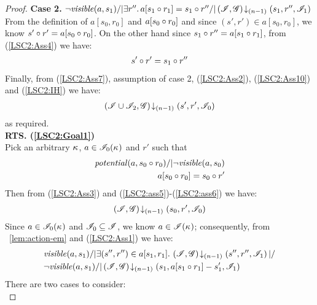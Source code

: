 \begin{lemma}
\begin{proof}
\noindent\textbf{Case 2. }
$\neg\mathit{visible}(a, s_1) /| \exists r''.\, a[s_1 \circ r_1] = s_1 \circ r'' /| \left(\mathscr{I}, \mathscr{G}\right) \!\downarrow_{(n-1)} \left(s_1, r'', \mathscr{I}_1\right)$\\
From the definition of $a[s_0, r_0]$ and $a[s_0 \circ r_0]$ and since $(s', r') \in a[s_0, r_0]$, we know $s' \circ r' = a[s_0 \circ r_0]$. On the other hand since $s_1 \circ r'' = a[s_1 \circ r_1]$, from (\ref{LSC2:Ass4}) we have:
%
\begin{align}
	s' \circ r' = s_1 \circ r'' \label{LSC2:Ass10}
\end{align}
%
Finally, from (\ref{LSC2:Ass7}), assumption of case 2, (\ref{LSC2:Ass2}), (\ref{LSC2:Ass10}) and (\ref{LSC2:IH}) we have: 
%
\begin{align*}
	\left(\mathscr{I} \cup \mathscr{I}_2, \mathscr{G}\right) \!\downarrow_{(n-1)} \left(s', r', \mathscr{I}_0\right)
\end{align*}
%
as required.\\
%
%
%
%

%
\noindent\textbf{RTS. (\ref{LSC2:Goal1})} \\
Pick an arbitrary $\kappa_{}$, $a \in \mathscr{I}_0(\kappa_{})$ and $r'$ such that
%
\begin{align}
	\mathit{potential}(a, s_0 \circ r_0) /| \neg\mathit{visible}(a, s_0) \label{LSC2:ass5}\\
	a[s_0 \circ r_0] = s_0 \circ r' \label{LSC2:ass6}
\end{align}
Then from (\ref{LSC2:Ass3}) and (\ref{LSC2:ass5})-(\ref{LSC2:ass6}) we have:
%
\begin{align}
	\left(\mathscr{I}, \mathscr{G}\right) \!\downarrow_{(n-1)} \left(s_0, r', \mathscr{I}_0\right) \label{LSC2:ass7}
\end{align}
%
Since $a \in \mathscr{I}_0(\kappa_{})$ and $\mathscr{I}_0 \subseteq \mathscr{I}$, we know $a \in \mathscr{I}(\kappa_{})$; consequently, from \lem~\ref{lem:action-em} and (\ref{LSC2:Ass1}) we have: 
%
\begin{align*}
	&	\mathit{visible}(a, s_1) /| \exists (s'', r'') \in a[s_1, r_1].\, \left(\mathscr{I}, \mathscr{G}\right) \!\downarrow_{(n-1)} \left(s'', r'', \mathscr{I}_1\right) |/ \\
	& \neg\mathit{visible}(a, s_1) /| \left(\mathscr{I}, \mathscr{G}\right) \!\downarrow_{(n-1)} \left(s_1, a[s_1 \circ r_1] - s_1', \mathscr{I}_1\right)
\end{align*}
There are two cases to consider:\\


\end{proof}
\end{lemma}
